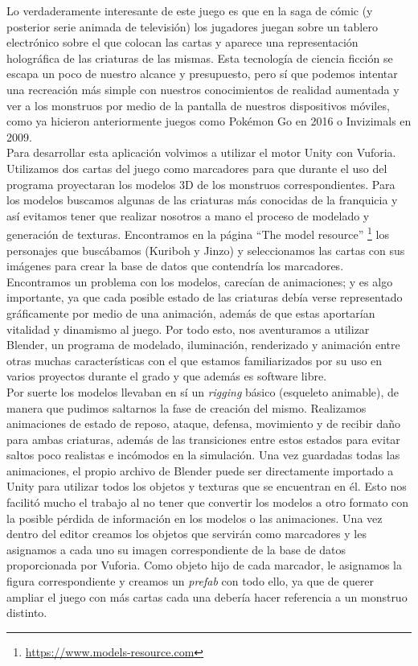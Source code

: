Lo verdaderamente interesante de este juego es que en la saga de cómic (y posterior serie animada de televisión) los jugadores juegan sobre un tablero electrónico sobre el que colocan las cartas y aparece una representación holográfica de las criaturas de las mismas. Esta tecnología de ciencia ficción se escapa un poco de nuestro alcance y presupuesto, pero sí que podemos intentar una recreación más simple con nuestros conocimientos de realidad aumentada y ver a los monstruos por medio de la pantalla de nuestros dispositivos móviles, como ya hicieron anteriormente juegos como Pokémon Go en 2016 o Invizimals en 2009.\\

Para desarrollar esta aplicación volvimos a utilizar el motor Unity con Vuforia. Utilizamos dos cartas del juego como marcadores para que durante el uso del programa proyectaran los modelos 3D de los monstruos correspondientes. Para los modelos buscamos algunas de las criaturas más conocidas de la franquicia y así evitamos tener que realizar nosotros a mano el proceso de modelado y generación de texturas. Encontramos en la página ``The model resource'' \footnote{ \url{https://www.models-resource.com}} los personajes que buscábamos (Kuriboh y Jinzo) y seleccionamos las cartas con sus imágenes para crear la base de datos que contendría los marcadores.\\

Encontramos un problema con los modelos,  carecían de animaciones; y es algo importante, ya que cada posible estado de las criaturas debía verse representado gráficamente por medio de una animación, además de que estas aportarían vitalidad y dinamismo al juego. Por todo esto, nos aventuramos a utilizar Blender, un programa de modelado, iluminación, renderizado y animación entre otras muchas características con el que estamos familiarizados por su uso en varios proyectos durante el grado y que además es software libre.\\

Por suerte los modelos llevaban en sí un \textit{rigging} básico (esqueleto animable), de manera que pudimos saltarnos la fase de creación del mismo. Realizamos animaciones de estado de reposo, ataque, defensa, movimiento y de recibir daño para ambas criaturas, además de las transiciones entre estos estados para evitar saltos poco realistas e incómodos en la simulación. Una vez guardadas todas las animaciones, el propio archivo de Blender puede ser directamente importado a Unity para utilizar todos los objetos y texturas que se encuentran en él. Esto nos facilitó mucho el trabajo al no tener que convertir los modelos a otro formato con la posible pérdida de información en los modelos o las animaciones. Una vez dentro del editor creamos los objetos que servirán como marcadores y les asignamos a cada uno su imagen correspondiente de la base de datos proporcionada por Vuforia. Como objeto hijo de cada marcador, le asignamos la figura correspondiente y creamos un \textit{prefab} con todo ello, ya que de querer ampliar el juego con más cartas cada una debería hacer referencia a un monstruo distinto.\\

